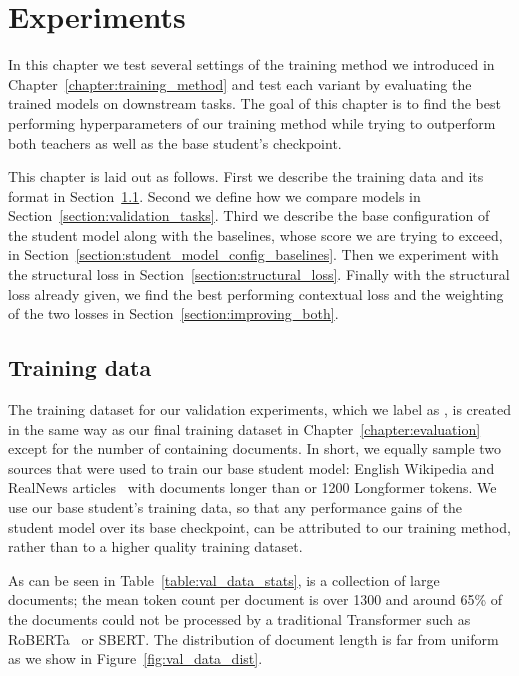 \chapter{Experiments}\label{chapter:experiments}


In this chapter we test several settings of the training method we introduced in
Chapter~\ref{chapter:training_method} and test each variant by evaluating the
trained models on downstream tasks. The goal of this chapter is to find the best
performing hyperparameters of our training method while trying to outperform
both teachers as well as the base student's checkpoint.

This chapter is laid out as follows. First we describe the training data and its
format in Section~\ref{section:val_training_data}. Second we define how we compare
models in Section~\ref{section:validation_tasks}. Third we describe the base
configuration of the student model along with the baselines, whose score we are
trying to exceed, in Section~\ref{section:student_model_config_baselines}. Then
we experiment with the structural loss in Section~\ref{section:structural_loss}.
Finally with the structural loss already given, we find the best performing
contextual loss and the weighting of the two losses in
Section~\ref{section:improving_both}.

\section{Training data}\label{section:val_training_data}

The training dataset for our validation experiments, which we label as
, is created in the same way as our final training dataset
 in Chapter~\ref{chapter:evaluation} except for the number
of containing documents. In short, we equally sample two sources that were used
to train our base student model: English Wikipedia and RealNews
articles~\citep{zellers2019defending} with documents longer than or 1200
Longformer tokens. We use our base student's training data, so that any
performance gains of the student model over its base checkpoint, can be
attributed to our training method, rather than to a higher quality training
dataset.

As can be seen in Table~\ref{table:val_data_stats},  is a
collection of large documents; the mean token count per document is over 1300
and around 65\% of the documents could not be processed by a traditional
Transformer such as RoBERTa~\citep{liu2019roberta} or SBERT. The distribution of
document length is far from uniform as we show in
Figure~\ref{fig:val_data_dist}.

